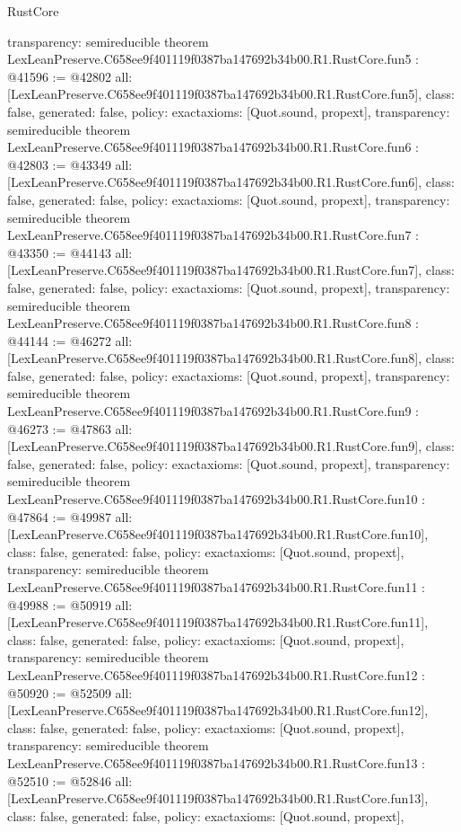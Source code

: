 \begin{lexlean}{RustCore}
\begin{coremodule}
{  transparency: semireducible
}
theorem LexLeanPreserve.C658ee9f401119f0387ba147692b34b00.R1.RustCore.fun5 : @41596 := @42802 {
  all: [LexLeanPreserve.C658ee9f401119f0387ba147692b34b00.R1.RustCore.fun5],
  class: false,
  generated: false,
  policy: exact{axioms: [Quot.sound, propext]},
  transparency: semireducible
}
theorem LexLeanPreserve.C658ee9f401119f0387ba147692b34b00.R1.RustCore.fun6 : @42803 := @43349 {
  all: [LexLeanPreserve.C658ee9f401119f0387ba147692b34b00.R1.RustCore.fun6],
  class: false,
  generated: false,
  policy: exact{axioms: [Quot.sound, propext]},
  transparency: semireducible
}
theorem LexLeanPreserve.C658ee9f401119f0387ba147692b34b00.R1.RustCore.fun7 : @43350 := @44143 {
  all: [LexLeanPreserve.C658ee9f401119f0387ba147692b34b00.R1.RustCore.fun7],
  class: false,
  generated: false,
  policy: exact{axioms: [Quot.sound, propext]},
  transparency: semireducible
}
theorem LexLeanPreserve.C658ee9f401119f0387ba147692b34b00.R1.RustCore.fun8 : @44144 := @46272 {
  all: [LexLeanPreserve.C658ee9f401119f0387ba147692b34b00.R1.RustCore.fun8],
  class: false,
  generated: false,
  policy: exact{axioms: [Quot.sound, propext]},
  transparency: semireducible
}
theorem LexLeanPreserve.C658ee9f401119f0387ba147692b34b00.R1.RustCore.fun9 : @46273 := @47863 {
  all: [LexLeanPreserve.C658ee9f401119f0387ba147692b34b00.R1.RustCore.fun9],
  class: false,
  generated: false,
  policy: exact{axioms: [Quot.sound, propext]},
  transparency: semireducible
}
theorem LexLeanPreserve.C658ee9f401119f0387ba147692b34b00.R1.RustCore.fun10 : @47864 := @49987 {
  all: [LexLeanPreserve.C658ee9f401119f0387ba147692b34b00.R1.RustCore.fun10],
  class: false,
  generated: false,
  policy: exact{axioms: [Quot.sound, propext]},
  transparency: semireducible
}
theorem LexLeanPreserve.C658ee9f401119f0387ba147692b34b00.R1.RustCore.fun11 : @49988 := @50919 {
  all: [LexLeanPreserve.C658ee9f401119f0387ba147692b34b00.R1.RustCore.fun11],
  class: false,
  generated: false,
  policy: exact{axioms: [Quot.sound, propext]},
  transparency: semireducible
}
theorem LexLeanPreserve.C658ee9f401119f0387ba147692b34b00.R1.RustCore.fun12 : @50920 := @52509 {
  all: [LexLeanPreserve.C658ee9f401119f0387ba147692b34b00.R1.RustCore.fun12],
  class: false,
  generated: false,
  policy: exact{axioms: [Quot.sound, propext]},
  transparency: semireducible
}
theorem LexLeanPreserve.C658ee9f401119f0387ba147692b34b00.R1.RustCore.fun13 : @52510 := @52846 {
  all: [LexLeanPreserve.C658ee9f401119f0387ba147692b34b00.R1.RustCore.fun13],
  class: false,
  generated: false,
  policy: exact{axioms: [Quot.sound, propext]},
}
\end{coremodule}
\end{lexlean}
